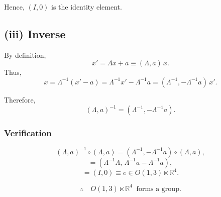 \documentclass[14pt]{article} %
\begin{document}
Hence, $(I,0)$ is the identity element.
\subsection*{(iii) Inverse}
By definition,
\[
x' = \Lambda x + a \equiv (\Lambda,a)\,x.
\]
Thus,
\[
x = \Lambda^{-1}(x' - a) 
   = \Lambda^{-1}x' - \Lambda^{-1}a
   = (\Lambda^{-1}, -\Lambda^{-1}a)\,x'.
\]

Therefore,
\[
(\Lambda,a)^{-1} = (\Lambda^{-1}, -\Lambda^{-1}a).
\]

\subsubsection*{Verification}
\[
(\Lambda,a)^{-1} \circ (\Lambda,a) 
= (\Lambda^{-1}, -\Lambda^{-1}a)\circ(\Lambda,a),
\]
\[
= (\Lambda^{-1}\Lambda, \, \Lambda^{-1}a - \Lambda^{-1}a),
\]
\[
= (I,0) \equiv e \in O(1,3)\ltimes \mathbb{R}^4.
\]

\[
\therefore \quad O(1,3)\ltimes \mathbb{R}^4 \;\; \text{forms a group.}
\]
\end{document}
